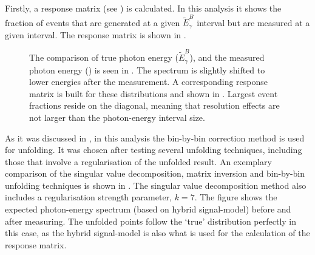Firstly, a response matrix (see ) is calculated.
In this analysis it shows the fraction of events that are generated at a given $\tilde{E}_{\gamma}^B$ interval but are measured at a given \EB interval.
The response matrix is shown in .

\begin{figure}[htbp!]
    \centering
    \caption{\label{fig:unfolding_setup} The comparison of true photon energy ($\tilde{E}_{\gamma}^B$),
    and the measured photon energy (\EB) is seen in .
    The spectrum is slightly shifted to lower energies after the measurement.
    A corresponding response matrix is built for these distributions and shown in .
    Largest \BtoXsgamma event fractions reside on the diagonal, meaning that resolution effects are not larger than the photon-energy interval size.
    }
\end{figure}

As it was discussed in , in this analysis the bin-by-bin correction method is used for unfolding.
It was chosen after testing several unfolding techniques, including those that involve a regularisation of the unfolded result.
An exemplary comparison of the singular value decomposition, matrix inversion and bin-by-bin unfolding techniques is shown in .
The singular value decomposition method also includes a regularisation strength parameter, $k=7$.
The figure shows the expected \BtoXsgamma photon-energy spectrum (based on hybrid signal-model) before and after measuring.
The unfolded points follow the `true' distribution perfectly in this case, as the hybrid signal-model is also what is used for the calculation of the response matrix.

